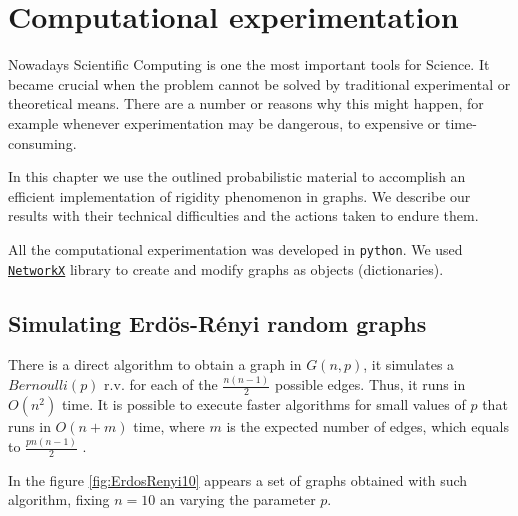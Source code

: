 
\chapter{Computational experimentation} %

\label{Chapter3} %



Nowadays Scientific Computing is one the most important tools for Science. It became crucial when the problem cannot be solved by traditional experimental or theoretical means. There are a number or reasons why this might happen, for example whenever experimentation may be dangerous, to expensive or time-consuming.

In this chapter we use the outlined probabilistic material to accomplish an efficient implementation of rigidity phenomenon in graphs. We describe our results with their technical difficulties and the actions taken to endure them.

All the computational experimentation was developed in \texttt{python}. We used \texttt{\href{https://networkx.github.io/}{NetworkX}} library to create and modify graphs as objects (dictionaries).

\section{Simulating Erdös-Rényi random graphs}

There is a direct algorithm to obtain a graph in $G(n,p)$, it simulates a $Bernoulli(p)$ r.v. for each of the $\frac{n(n-1)}{2}$ possible edges. Thus, it runs in $O(n^2)$ time. It is possible to execute faster algorithms for small values of $p$ that runs in $O(n + m)$ time, where $m$ is the expected number of edges, which equals to $\frac{pn(n - 1)}{2}$ \cite[Batagelj, Brandes 05]{fastER}.

In the figure \ref{fig:ErdosRenyi10} appears a set of graphs obtained with such algorithm, fixing $n=10$ an varying the parameter $p$.

